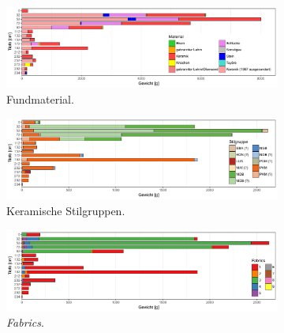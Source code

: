\begin{figure}[p]
	\centering
	\begin{subfigure}{\textwidth}	
		\centering
		\includegraphics[width = \textwidth]{fig/9-8_PIK87-1_VerteilungFunde_R.pdf}
		\caption{Fundmaterial.\vspace{1em}}	
		\label{fig:PIK87-1_VerteilungFunde}
	\end{subfigure}
	\begin{subfigure}{\textwidth}
		\centering
		\includegraphics[width = \textwidth]{fig/9-8_PIK87-1_KeramikStilgruppen_R.pdf}
		\caption{Keramische Stilgruppen.\vspace{1em}}
		\label{fig:PIK87-1_VerteilungStilgr}
	\end{subfigure}
	\begin{subfigure}{\textwidth}	
		\centering
		\includegraphics[width = \textwidth]{fig/9-8_PIK87-1_Fabrics_R.pdf}
		\caption{\textit{Fabrics}.\vspace{1em}}
		\label{fig:PIK87-1_VerteilungFabrics}
	\end{subfigure}
	\begin{subfigure}{\textwidth}	

\end{subfigure}
\end{figure}
